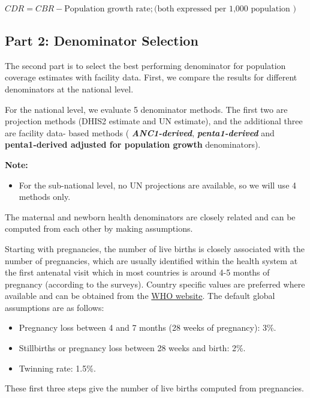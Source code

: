 \documentclass[
  english,
  letterpaper,
  DIV=11,
  numbers=noendperiod]{scrreprt}
\providecommand{\tightlist}{%
  \setlength{\itemsep}{0pt}\setlength{\parskip}{0pt}}
\begin{document}
\(CDR = CBR - \text{Population growth rate} ; \text{(both expressed per 1,000 population )}\)

\subsection{Part 2: Denominator
Selection}\label{part-2-denominator-selection}

The second part is to select the best performing denominator for
population coverage estimates with facility data. First, we compare the
results for different denominators at the national level.

For the national level, we evaluate 5 denominator methods. The first two
are projection methods (DHIS2 estimate and UN estimate), and the
additional three are facility data- based methods (
\textbf{\emph{ANC1-derived}}, \textbf{\emph{penta1-derived}} and
\textbf{penta1-derived adjusted for population growth} denominators).

\textbf{Note:}

\begin{itemize}
\tightlist
\item
  For the sub-national level, no UN projections are available, so we
  will use 4 methods only.
\end{itemize}

The maternal and newborn health denominators are closely related and can
be computed from each other by making assumptions.

Starting with pregnancies, the number of live births is closely
associated with the number of pregnancies, which are usually identified
within the health system at the first antenatal visit which in most
countries is around 4-5 months of pregnancy (according to the surveys).
Country specific values are preferred where available and can be
obtained from the
\href{https://data.unicef.org/topic/child-survival/neonatal-mortality/}{WHO
website}. The default global assumptions are as follows:

\begin{itemize}
\tightlist
\item
  Pregnancy loss between 4 and 7 months (28 weeks of pregnancy): 3\%.
\item
  Stillbirths or pregnancy loss between 28 weeks and birth: 2\%.
\item
  Twinning rate: 1.5\%.
\end{itemize}

These first three steps give the number of live births computed from
pregnancies.
\end{document}
